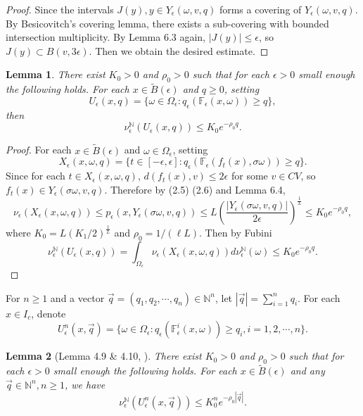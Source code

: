 \documentclass[11pt,oneside]{article}
\theoremstyle{plain}
\newtheorem{lem}{Lemma}[section]
\numberwithin{equation}{section}
\numberwithin{figure}{section}
\numberwithin{table}{section}
\begin{document}
\begin{proof}
Since the intervals $J(y), y \in Y_{\epsilon} (\omega, v, q) $ forms a covering of $Y_{\epsilon} (\omega, v, q)$. By Besicovitch's covering lemma, there exists a sub-covering with bounded intersection multiplicity. By Lemma 6.3 again, $|J(y)| \leq \epsilon$, so $J(y) \subset B(v, 3\epsilon)$. Then we obtain the desired estimate.

\end{proof}



\begin{lem}
There exist $K_0 > 0$ and $\rho_0 > 0$ such that for each $\epsilon > 0$ small enough the following holds. For each $x \in \tilde B(\epsilon)$ and $ q \geq 0$, setting 
\[
U_{\epsilon} (x, q) = \{ \omega \in \Omega_{\epsilon} : q_{\epsilon} (\mathbb F_{\epsilon}(x, \omega)) \geq q \},
\]
then 
\[
\nu_{\epsilon}^{\mathbb N} (U_{\epsilon} (x, q)) \leq K_0 e^{- \rho_0 q}.
\]
\end{lem}


\begin{proof}

For each $x \in \tilde B(\epsilon)$ and $\omega \in \Omega_{\epsilon}$, setting 
\[
X_{\epsilon} (x, \omega, q) = \{ t \in [-\epsilon, \epsilon]: q_{\epsilon} (\mathbb F_{\epsilon}(f_t(x),  \sigma \omega)) \geq q \}.
\]
Since for each $t \in X_{\epsilon} (x, \omega, q)$, $d(f_t(x), v) \leq 2 \epsilon$ for some $v \in CV$, so $f_t(x) \in Y_{\epsilon} ( \sigma \omega, v, q)$. Therefore by (2.5) (2.6) and Lemma 6.4,
\[
\nu_{\epsilon} (X_{\epsilon} (x, \omega, q)) \leq p_{\epsilon} (x, Y_{\epsilon} (\sigma \omega, v, q)) \leq L \left( \frac{|Y_{\epsilon} (\sigma \omega, v, q)|}{2\epsilon} \right)^{\frac{1}{L}} \leq K_0 e^{- \rho_0 q},
\]
where $K_0 = L (K_1/2)^{\frac{1}{L}}$ and $\rho_0 = 1/(\ell L)$. Then by Fubini
\[
\nu_{\epsilon}^{\mathbb N} (U_{\epsilon} (x, q)) = \int_{\Omega_{\epsilon}} \nu_{\epsilon} (X_{\epsilon} (x, \omega, q))  d \nu_{\epsilon}^{\mathbb N} (\omega) \leq K_0 e^{- \rho_0 q}.
\]

\end{proof}
\fi

For $n \geq 1$ and a vector $\vec q = (q_1, q_2, \cdots, q_n) \in \mathbb N^n$,  let $|\vec q| = \sum_{i=1}^n q_i$. For each $x \in I_c$, denote
\[
U_{\epsilon}^n (x, \vec q) = \{ \omega \in \Omega_{\epsilon} : q_{\epsilon} (\mathbb F^i_{\epsilon}(x, \omega)) \geq q_i, i =1, 2, \cdots, n \}.
\]


\begin{lem}[Lemma 4.9 \& 4.10, \cite{LR}]

There exist $K_0 > 0$ and $\rho_0 > 0$ such that for each $\epsilon > 0$ small enough the following holds. For each $x \in \tilde B(\epsilon)$ and any $\vec q  \in \mathbb N^n, n \geq 1$, we have 
\[
\nu_{\epsilon}^{\mathbb N} (U_{\epsilon}^n (x, \vec q)) \leq K_0^n e^{- \rho_0 |\vec q|}.
\]
\end{lem}
\end{document}
